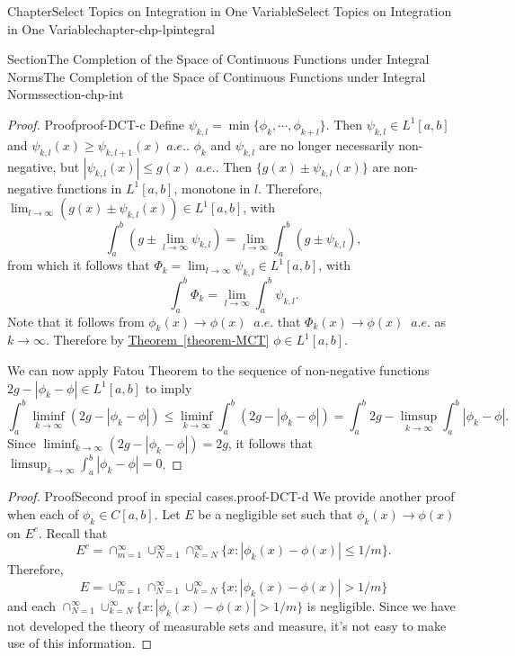 \documentclass[oneside,10pt,]{book}
\newcommand{\xreffont}{\relax}
\numberwithin{equation}{section}
\begin{document}
\begin{chapterptx}{Chapter}{Select Topics on Integration in One Variable}{}{Select Topics on Integration in One Variable}{}{}{chapter-chp-lpintegral}
\begin{sectionptx}{Section}{The Completion of the Space of Continuous Functions under Integral Norms}{}{The Completion of the Space of Continuous Functions under Integral Norms}{}{}{section-chp-int}
\begin{proof}{Proof}{}{proof-DCT-c}
Define \(\psi_{k,l}=\min\{\phi_{k},\cdots, \phi_{k+l}\}\). Then \(\psi_{k,l}\in L^{1}[a, b]\) and \(\psi_{k,l}(x)\ge \psi_{k,l+1}(x)\) \(a.e.\). \(\phi_{k}\) and \(\psi_{k,l}\) are no longer necessarily non-negative, but \(|\psi_{k,l}(x)|\le g(x)\) \(a.e.\). Then \(\{ g(x)\pm \psi_{k,l}(x)\}\) are non-negative functions in \(L^{1}[a, b]\), monotone in \(l\). Therefore, \(\lim_{l\to\infty} (g(x)\pm \psi_{k,l}(x)) \in L^{1}[a, b]\), with%
\begin{equation*}
\int_{a}^{b}\left( g \pm \lim_{l\to\infty} \psi_{k,l}\right)
=\lim_{l\to\infty} \int_{a}^{b}\left( g\pm \psi_{k,l}\right),
\end{equation*}
from which it follows that \(\Phi_{k}= \lim_{l\to\infty} \psi_{k,l}\in L^{1}[a, b]\), with%
\begin{equation*}
\int_{a}^{b} \Phi_{k} = \lim_{l\to\infty} \int_{a}^{b} \psi_{k,l}.
\end{equation*}
Note that it follows from \(\phi_{k}(x)\to \phi(x)\) \(\ a.e.\) that  \(\Phi_{k}(x)\to \phi (x)\) \(\ a.e.\) as \(k\to \infty\). Therefore by \hyperref[theorem-MCT]{Theorem~{\xreffont\ref{theorem-MCT}}} \(\phi \in L^{1}[a, b]\).%
\par
We can now apply Fatou Theorem to the sequence of non-negative functions \(2 g - |\phi_{k}-\phi| \in L^{1}[a, b]\) to imply%
\begin{equation*}
\int_{a}^{b} \liminf_{k\to\infty}\left( 2 g - |\phi_{k}-\phi|\right)
\le \liminf_{k\to\infty} \int_{a}^{b} \left( 2 g - |\phi_{k}-\phi|\right)
= \int_{a}^{b} 2g - \limsup_{k\to\infty} \int_{a}^{b} |\phi_{k}-\phi|.
\end{equation*}
Since \(\liminf_{k\to\infty}\left( 2 g - |\phi_{k}-\phi|\right)=2g\), it follows that \(\limsup_{k\to\infty}  \int_{a}^{b }|\phi_{k}-\phi|=0\).%
\end{proof}
\begin{proof}{Proof}{Second proof in special cases.}{proof-DCT-d}
We provide another proof when each of \(\phi_{k} \in C[a, b]\). Let \(E\) be a negligible set such that \(\phi_{k}(x)\to \phi(x)\) on \(E^{c}\). Recall that%
\begin{equation*}
E^{c}=\cap_{m=1}^{\infty}\cup_{N=1}^{\infty}\cap_{k=N}^{\infty}\{x: |\phi_{k}(x)-\phi(x)| \le 1/m\}.
\end{equation*}
Therefore,%
\begin{equation*}
E= \cup_{m=1}^{\infty}\cap_{N=1}^{\infty}\cup_{k=N}^{\infty}\{x: |\phi_{k}(x)-\phi(x)| > 1/m\}
\end{equation*}
and  each \(\cap_{N=1}^{\infty}\cup_{k=N}^{\infty}\{x: |\phi_{k}(x)-\phi(x)| > 1/m\}\) is negligible. Since we have not developed the theory of measurable sets and measure, it's not easy to make use of this information.%

\end{proof}
\end{sectionptx}
\end{chapterptx}
\end{document}
